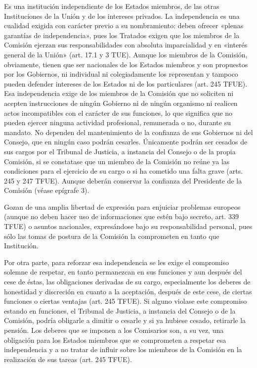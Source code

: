 \documentclass[10pt,a4paper]{article}
\begin{document}
Es una institución independiente de los Estados miembros, de las otras Instituciones de la Unión y de los intereses privados. La independencia es una cualidad exigida con carácter previo a su nombramiento: deben ofrecer «plenas garantías de independencia», pues los Tratados exigen que los miembros de la Comisión ejerzan sus responsabilidades con absoluta imparcialidad y en «interés general de la Unión» (art. 17.1 y 3 TUE). Aunque los miembros de la Comisión, obviamente, tienen que ser nacionales de los Estados miembros y son propuestos por los Gobiernos, ni individual ni colegiadamente los representan y tampoco pueden defender intereses de los Estados ni de los particulares (art. 245 TFUE). Esa independencia exige de los miembros de la Comisión que no soliciten ni acepten instrucciones de ningún Gobierno ni de ningún organismo ni realicen actos incompatibles con el carácter de sus funciones, lo que significa que no pueden ejercer ninguna actividad profesional, remunerada o no, durante su mandato. No dependen del mantenimiento de la confianza de sus Gobiernos ni del Consejo, que en ningún caso podrán cesarles. Únicamente podrán ser cesados de sus cargos por el Tribunal de Justicia, a instancia del Consejo o de la propia Comisión, si se constatase que un miembro de la Comisión no reúne ya las condiciones para el ejercicio de su cargo o si ha cometido una falta grave (arts. 245 y 247 TFUE). Aunque deberán conservar la confianza del Presidente de la Comisión (véase epígrafe 3).

Gozan de una amplia libertad de expresión para enjuiciar problemas europeos (aunque no deben hacer uso de informaciones que estén bajo secreto, art. 339 TFUE) o asuntos nacionales, expresándose bajo su responsabilidad personal, pues sólo las tomas de postura de la Comisión la comprometen en tanto que Institución.

Por otra parte, para reforzar esa independencia se les exige el compromiso solemne de respetar, en tanto permanezcan en sus funciones y aun después del cese de éstas, las obligaciones derivadas de su cargo, especialmente los deberes de honestidad y discreción en cuanto a la aceptación, después de este cese, de ciertas funciones o ciertas ventajas (art. 245 TFUE). Si alguno violase este compromiso estando en funciones, el Tribunal de Justicia, a instancia del Consejo o de la Comisión, podría obligarle a dimitir o cesarle y si ya hubiese cesado, retirarle la pensión. Los deberes que se imponen a los Comisarios son, a su vez, una obligación para los Estados miembros que se comprometen a respetar esa independencia y a no tratar de influir sobre los miembros de la Comisión en la realización de sus tareas (art. 245 TFUE). 
\end{document}
